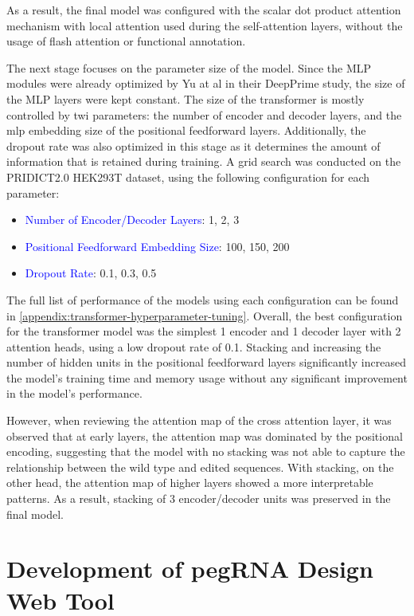 As a result, the final model was configured with the scalar dot product attention mechanism with local attention used during the self-attention layers, without the usage of flash attention or functional annotation.

The next stage focuses on the parameter size of the model. Since the MLP modules were already optimized by Yu at al in their DeepPrime study, the size of the MLP layers were kept constant. The size of the transformer is mostly controlled by twi parameters: the number of encoder and decoder layers, and the mlp embedding size of the positional feedforward layers. Additionally, the dropout rate was also optimized in this stage as it determines the amount of information that is retained during training. A grid search was conducted on the PRIDICT2.0 HEK293T dataset, using the following configuration for each parameter:

\begin{itemize}[itemsep=-0mm]
    \item \textcolor{blue}{Number of Encoder/Decoder Layers}: 1, 2, 3
    \item \textcolor{blue}{Positional Feedforward Embedding Size}: 100, 150, 200
    \item \textcolor{blue}{Dropout Rate}: 0.1, 0.3, 0.5
\end{itemize}

The full list of performance of the models using each configuration can be found in \autoref{appendix:transformer-hyperparameter-tuning}. Overall, the best configuration for the transformer model was the simplest 1 encoder and 1 decoder layer with 2 attention heads, using a low dropout rate of 0.1. Stacking and increasing the number of hidden units in the positional feedforward layers significantly increased the model's training time and memory usage without any significant improvement in the model's performance. 

However, when reviewing the attention map of the cross attention layer, it was observed that at early layers, the attention map was dominated by the positional encoding, suggesting that the model with no stacking was not able to capture the relationship between the wild type and edited sequences. With stacking, on the other head, the attention map of higher layers showed a more interpretable patterns. As a result, stacking of 3 encoder/decoder units was preserved in the final model.

\section{Development of pegRNA Design Web Tool}

